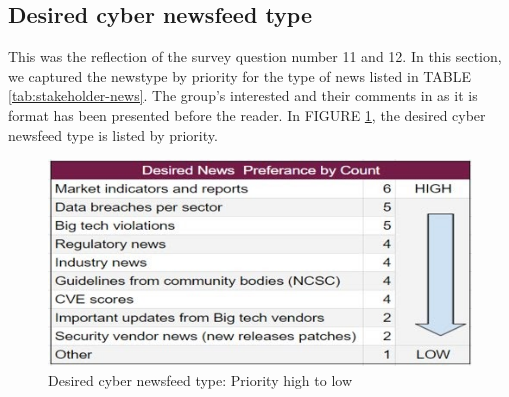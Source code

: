 \subsection{Desired cyber newsfeed type}
\label{sec:desire}
This was the reflection of the survey question number 11 and 12. In this section, we captured the newstype by priority for the type of news listed in TABLE \ref{tab:stakeholder-news}. 
The group's interested and their comments in as it is format has been presented before the reader. In FIGURE \ref{fig:product-desire}, the desired cyber newsfeed type is listed by priority.

\begin{figure}[ht]
    \centering
    \includegraphics[width=.75\linewidth]{Figures/product-desire.jpg}
    \caption{Desired cyber newsfeed type: Priority high to low}
    \label{fig:product-desire}
\end{figure}
 \FloatBarrier
